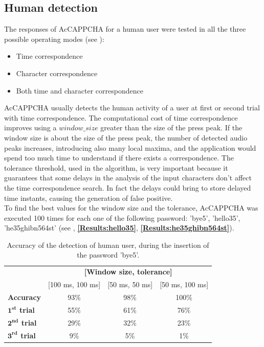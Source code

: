 \subsection{Human detection}\label{Results:human}
The responses of AcCAPPCHA for a human user were tested in all the three possible operating modes (see ): 
\begin{itemize}
\item{Time correspondence}
\item{Character correspondence}
\item{Both time and character correspondence}
\end{itemize}
AcCAPPCHA usually detects the human activity of a user at first or second trial  with time correspondence. The computational cost of time correspondence improves using a $window\_size$ greater than the size of the press peak. If the window size is about the size of the press peak, the number of detected audio peaks increases, introducing also many local maxima, and the application would spend too much time to understand if there exists a correspondence. The tolerance threshold, used in the algorithm, is very important because it guarantees that some delays in the analysis of the input characters don't affect the time correspondence search. In fact the delays could bring to store delayed time instants, causing the generation of false positive.\\
To find the best values for the window size and the tolerance, AcCAPPCHA was executed 100 times for each one of the following password: 'bye5', 'hello35', 'he35ghibn564st' (see , \textbf{\ref{Results:hello35}}, \textbf{\ref{Results:he35ghibn564st}}).
\begin{table}[H]
\centering\footnotesize
\begin{tabular}{lccc}
\cline{2-4}
&\multicolumn{3}{c}{\textbf{[Window size, tolerance]}}\\
\cline{2-4}
&{[100 ms, 100 ms]}&{[50 ms, 50 ms]}&{[50 ms, 100 ms]}\\
\hline
{\textbf{Accuracy}}&{93\%}&{98\%}&{100\%}\\
\hline
{\textbf{$\mathbf{1^{st}}$ trial}}&{55\%}&{61\%}&{76\%}\\
\hline
{\textbf{$\mathbf{2^{nd}}$ trial}}&{29\%}&{32\%}&{23\%}\\
\hline
{\textbf{$\mathbf{3^{rd}}$ trial}}&{9\%}&{5\%}&{1\%}\\
\hline
\end{tabular}
\caption{\footnotesize{Accuracy of the detection of human user, during the insertion of the password 'bye5'.}}
\label{Results:bye5}
\end{table}
